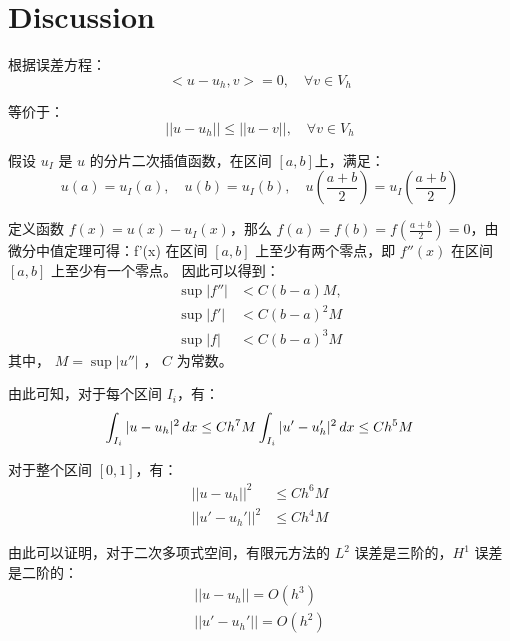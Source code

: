 \documentclass[11pt]{ctexart}
\begin{document}
\section{Discussion}
根据误差方程：
\begin{equation}
     <u-u_h,v> = 0, \quad \forall v \in V_h
\end{equation}

等价于：
\begin{equation}
     || u-u_h || \le || u-v ||, \quad \forall v \in V_h
\end{equation}

假设 $ u_I $ 是 $ u $ 的分片二次插值函数，在区间 $ [a,b] $上，满足：
\begin{equation}
     u(a) = u_I(a), \quad u(b) = u_I(b), \quad u(\frac{a+b}{2}) = u_I(\frac{a+b}{2})
\end{equation}

定义函数 $ f(x) = u(x) - u_I(x) $，那么 $ f(a) = f(b) = f(\frac{a+b}{2}) = 0 $，由微分中值定理可得：f'(x) 在区间 $ [a,b] $ 上至少有两个零点，即 $ f''(x) $ 在区间 $ [a,b] $ 上至少有一个零点。 因此可以得到：
\begin{equation}
     \begin{aligned}
          \sup|f''| &< C(b-a)M, \\
          \sup|f'| &< C(b-a)^2M\\
          \sup|f| &< C(b-a)^3M
     \end{aligned}
\end{equation}
其中， $ M = \sup|u''| $ ， $ C $ 为常数。

由此可知，对于每个区间 $ I_i $，有：
\begin{equation}
     \int_{I_i} |u-u_h|^2 \, dx \le C h^7M\\
     \int_{I_i} |u'-u_h'|^2 \, dx \le C h^5M
\end{equation}

对于整个区间 $ [0,1] $，有：
\begin{equation}
     \begin{aligned}
          ||u-u_h||^2 &\le C h^6M\\
          ||u'-u_h'||^2 &\le C h^4M
     \end{aligned}
\end{equation}

由此可以证明，对于二次多项式空间，有限元方法的 $ L^2 $ 误差是三阶的，$ H^1 $ 误差是二阶的：
\begin{equation}
     \begin{aligned}
          ||u-u_h|| = O(h^3)\\
          ||u'-u_h'|| = O(h^2)
     \end{aligned}
\end{equation}
\end{document}
